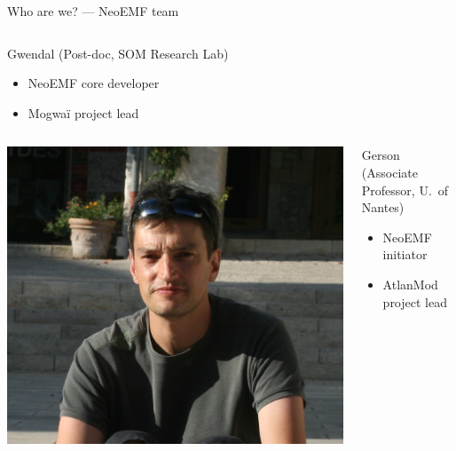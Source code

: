 \begin{frame}{Who are we? --- NeoEMF team}

\begin{columns}
\centering
\centering
\begin{block}{Gwendal (Post-doc, SOM Research Lab)}
\begin{itemize}
\item NeoEMF core developer
\item Mogwaï project lead
\end{itemize}
\end{block}
\end{columns}

\begin{columns}
\centering
\includegraphics[height=.25\textheight,clip,trim={0 3cm 0 0}]{biopic-04-gerson}
\begin{block}{Gerson (Associate Professor, U.\ of Nantes)}
\begin{itemize}
\item NeoEMF initiator
\item AtlanMod project lead
\end{itemize}
\end{block}
\end{columns}

\end{frame}


